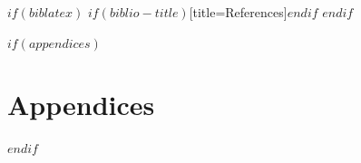 \documentclass[
	a4paper,
	12pt,
]{$document_class$}
\begin{document}


$if(biblatex)$
\printbibliography$if(biblio-title)$[title=References]$endif$
$endif$

$if(appendices)$
\newpage

\section*{Appendices}
$endif$

\end{document}
